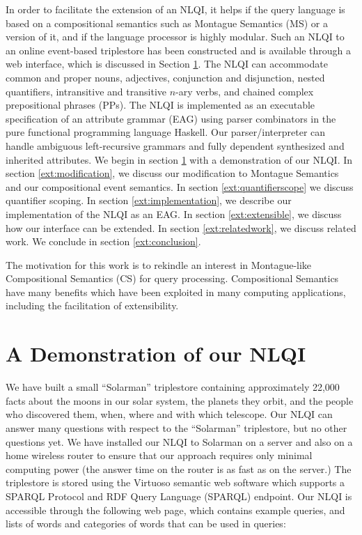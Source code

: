 \documentclass[../main.tex]{subfiles}
\begin{document}
\begin{refsection}
In order to facilitate the extension of an NLQI, it helps if the query language is based on a compositional
semantics such as Montague Semantics (MS) \cite{Dowty:wall} or a version of it, and if the language processor is highly
modular. Such an NLQI to an online event-based triplestore has been constructed and is available
through a web interface, which is discussed in Section \ref{ext:demonstration}. The NLQI can accommodate common and
proper nouns, adjectives, conjunction and disjunction, nested quantifiers, intransitive and transitive $n$-ary verbs, and chained complex prepositional phrases (PPs). The NLQI is implemented as an executable
specification of an attribute grammar (EAG) using parser combinators in the pure functional programming
language Haskell.
Our parser/interpreter can handle ambiguous left-recursive grammars and fully dependent synthesized
and inherited attributes.
We begin in section \ref{ext:demonstration} with a demonstration of our NLQI. In section \ref{ext:modification}, we discuss our modification to
Montague Semantics and our compositional event semantics. In section \ref{ext:quantifierscope} we discuss quantifier scoping. In section \ref{ext:implementation}, we describe our implementation
of the NLQI as an EAG. In section \ref{ext:extensible}, we discuss how our interface can be extended. In section \ref{ext:relatedwork}, we discuss related work. We conclude in section \ref{ext:conclusion}.

The motivation for this work is to rekindle an interest in Montague-like Compositional Semantics (CS) for query processing. Compositional Semantics have many benefits which have been exploited in many computing applications, including the facilitation of extensibility.

\section{A Demonstration of our NLQI}
\label{ext:demonstration}
We have built a small ``Solarman'' triplestore containing approximately 22,000 facts about the moons in
our solar system, the planets they orbit, and the people who discovered them, when, where and with
which telescope. Our NLQI can answer many questions with respect to the ``Solarman'' triplestore, but no other questions yet. We
have installed our NLQI to Solarman on a server and also on a home wireless router to ensure that our
approach requires only minimal computing power (the answer time on the router is as fast as on the
server.) The triplestore is stored using the Virtuoso semantic web software which supports a SPARQL Protocol and RDF Query Language (SPARQL)
endpoint. Our NLQI is accessible through the following web page, which contains example queries, and
lists of words and categories of words that can be used in queries:


\end{refsection}
\end{document}
